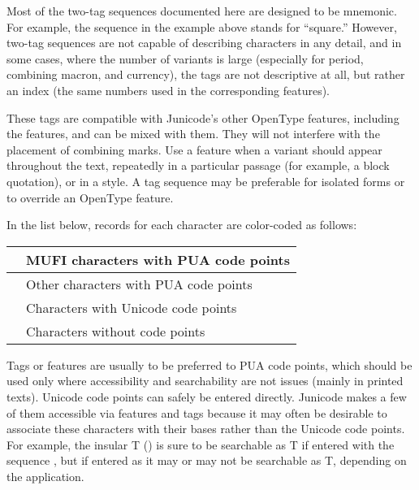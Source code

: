 Most of the two-tag sequences documented here are designed to be mnemonic. For example, the
 sequence in the example
above stands for ``square.'' However, two-tag sequences are not capable of describing characters in any detail, and in
some cases, where the number of variants is large (especially for period, combining macron, and currency), the tags are
not descriptive at all, but rather an index (the same numbers used in the corresponding {\charvar} features).

These tags are compatible with Junicode's other OpenType features, including the {\charvar} features, and can be mixed with
them. They will not interfere with the placement of combining marks. Use a {\charvar} feature when a variant should appear
throughout the text, repeatedly in a particular passage (for example, a block quotation), or in a style. A tag sequence may be preferable for isolated forms or to override an OpenType feature.

In the list below, records for each character are color-coded as follows:

\begin{center}
  \tablefirsthead{}
  \tablehead{}
  \tabletail{\hline}
  \tablelasttail{\hline}
  \begin{supertabular}{|m{13mm}|m{72mm}|}
    \hline
     & MUFI characters with PUA code points\\\hline
     & Other characters with PUA code points\\\hline
     & Characters with Unicode code points\\\hline
     & Characters without code points\\
  \end{supertabular}
\end{center}

\noindent Tags or {\charvar} features are usually to be preferred to PUA code points,
which should be used only where accessibility and searchability are
not issues (mainly in printed texts). Unicode code points can safely be
entered directly. Junicode makes a few of them accessible via {\charvar} features and tags because it may often
be desirable to associate these characters with their bases rather than the Unicode code points. For
example, the insular T () is sure to be searchable as T if entered with the sequence
, but if entered as  it may or may not be searchable as T,
depending on the application.


